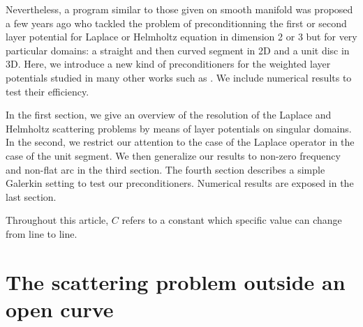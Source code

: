 \documentclass[a4paper]{article}
\begin{document}
	Nevertheless, a program similar to those given on smooth manifold was proposed a few years ago \cite{Bruno,Nedelec,Jerez,Hiptmair} who tackled the problem of preconditionning the first or second layer potential
	for Laplace or Helmholtz equation in dimension 2 or 3 but for very particular domains: a straight and then curved segment in 2D and a unit disc in 3D. Here, we introduce a new kind of preconditioners for the weighted layer potentials studied in many other works such as \cite{bruno2012second}. We include numerical results to test their efficiency. 
		
	In the first section, we give an overview of the resolution of the Laplace and Helmholtz scattering problems by means of layer potentials on singular domains. In the second, we restrict our attention to the case of the Laplace operator in the case of the unit segment. We then generalize our results to non-zero frequency and non-flat arc in the third section. The fourth section describes a simple Galerkin setting to test our preconditioners. Numerical results are exposed in the last section. 
	
	
	
	Throughout this article, $C$ refers to a constant which specific value can change from line to line. 
	
	\section{The scattering problem outside an open curve}
	
\end{document}
